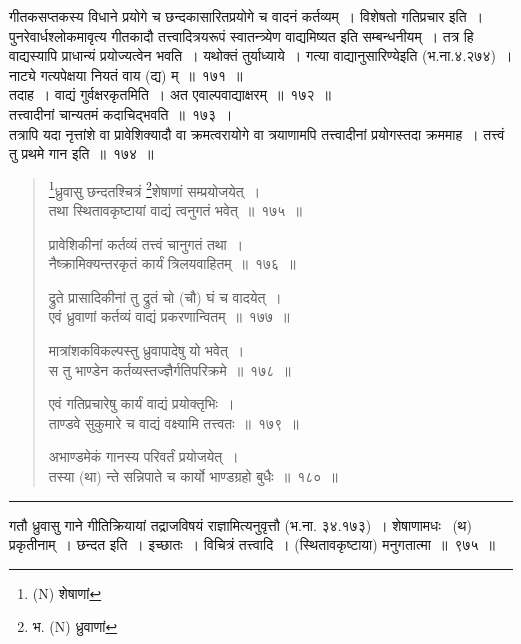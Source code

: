 \documentclass[11pt, openany]{book}
\begin{document}
गीतकसप्तकस्य विधाने प्रयोगे च छन्दकासारितप्रयोगे च वादनं कर्तव्यम्~। विशेषतो गतिप्रचार इति~। पुनरेवार्धश्लोकमावृत्य गीतकादौ तत्त्वादित्रयरूपं स्वातन्त्र्येण वाद्यमिष्यत इति सम्बन्धनीयम्~। तत्र हि वाद्यस्यापि प्राधान्यं प्रयोज्यत्वेन भवति~। यथोक्तं तुर्याध्याये~। गत्या वाद्यानुसारिण्येइति (भ.ना.४.२७४)~। नाट्ये गत्यपेक्षया नियतं वाय (द्य) म्~॥~१७१~॥\\

तदाह~। वाद्यं गुर्वक्षरकृतमिति~। अत एवाल्पवाद्याक्षरम्~॥~१७२~॥\\

तत्त्वादीनां चान्यतमं कदाचिद्भवति~॥~१७३~।\\

तत्रापि यदा नृत्तांशे वा प्रावेशिक्यादौ वा क्रमत्वरायोगे वा त्रयाणामपि तत्त्वादीनां प्रयोगस्तदा क्रममाह~। तत्त्वं तु प्रथमे गान इति~॥~१७४~॥

\newpage

\begin{quote}
{\na \renewcommand{\thefootnote}{1a}\footnote{(N) शेषाणां}ध्रुवासु छन्दतश्चित्रं \renewcommand{\thefootnote}{1}\footnote{भ. (N) ध्रुवाणां}शेषाणां सम्प्रयोजयेत्~।\\
तथा स्थितावकृष्टायां वाद्यं त्वनुगतं भवेत्~॥~१७५~॥

प्रावेशिकीनां कर्तव्यं तत्त्वं चानुगतं तथा~।\\
नैष्क्रामिक्यन्तरकृतं कार्यं त्रिलयवाहितम्~॥~१७६~॥

द्रुते प्रासादिकीनां तु द्रुतं चो (चौ) घं च वादयेत्~।\\
एवं ध्रुवाणां कर्तव्यं वाद्यं प्रकरणान्वितम्~॥~१७७~॥

मात्रांशकविकल्पस्तु ध्रुवापादेषु यो भवेत्~।\\
स तु भाण्डेन कर्तव्यस्तज्ज्ञैर्गतिपरिक्रमे~॥~१७८~॥

एवं गतिप्रचारेषु कार्यं वाद्यं प्रयोक्तृभिः~।\\
ताण्डवे सुकुमारे च वाद्यं वक्ष्यामि तत्त्वतः~॥~१७९~॥

अभाण्डमेकं गानस्य परिवर्तं प्रयोजयेत्~।\\
तस्या (था) न्ते सन्निपाते च कार्यो भाण्डग्रहो बुधैः~॥~१८०~॥}
\end{quote}

\hrule

\vspace{2mm}
गतौ ध्रुवासु गाने गीतिक्रियायां तद्राजविषयं राज्ञामित्यनुवृत्तौ (भ.ना. ३४.१७३)~। शेषाणामधः \textendash\   (थ) प्रकृतीनाम्~। छन्दत इति~। इच्छातः~। विचित्रं तत्त्वादि~। (स्थितावकृष्टाया) मनुगतात्मा~॥~९७५~॥\\
\end{document}
